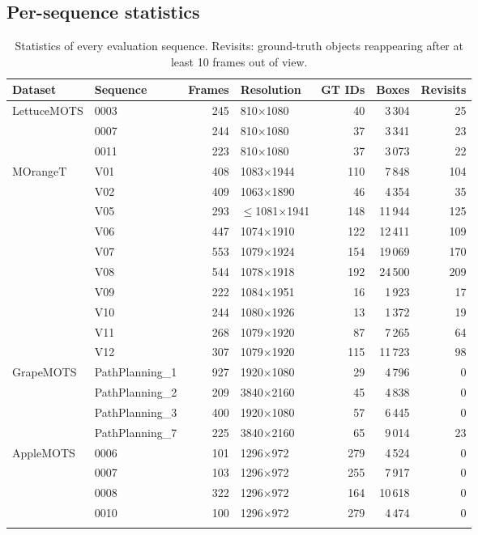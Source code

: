 \documentclass[pdflatex,sn-basic]{sn-jnl}%
\theoremstyle{thmstyleone}%
\begin{document}
\clearpage
\begin{appendices}

\section{Per-sequence statistics}\label{sec:app-seq}

\begin{table}[!h]
\caption{Statistics of every evaluation sequence. Revisits: ground-truth objects reappearing after at least 10 frames out of view.}\label{tab:seqstats}
\footnotesize
\begin{tabular*}{\textwidth}{@{\extracolsep\fill}llrlrrr@{}}
\toprule
Dataset & Sequence & Frames & Resolution & GT IDs & Boxes & Revisits \\
\midrule
\multirow{3}{*}{LettuceMOTS} & 0003 & 245 & 810$\times$1080 & 40 & 3\,304 & 25 \\
 & 0007 & 244 & 810$\times$1080 & 37 & 3\,341 & 23 \\
 & 0011 & 223 & 810$\times$1080 & 37 & 3\,073 & 22 \\
\midrule
\multirow{10}{*}{MOrangeT} & V01 & 408 & 1083$\times$1944 & 110 & 7\,848 & 104 \\
 & V02 & 409 & 1063$\times$1890 & 46 & 4\,354 & 35 \\
 & V05 & 293 & $\le$1081$\times$1941 & 148 & 11\,944 & 125 \\
 & V06 & 447 & 1074$\times$1910 & 122 & 12\,411 & 109 \\
 & V07 & 553 & 1079$\times$1924 & 154 & 19\,069 & 170 \\
 & V08 & 544 & 1078$\times$1918 & 192 & 24\,500 & 209 \\
 & V09 & 222 & 1084$\times$1951 & 16 & 1\,923 & 17 \\
 & V10 & 244 & 1080$\times$1926 & 13 & 1\,372 & 19 \\
 & V11 & 268 & 1079$\times$1920 & 87 & 7\,265 & 64 \\
 & V12 & 307 & 1079$\times$1920 & 115 & 11\,723 & 98 \\
\midrule
\multirow{4}{*}{GrapeMOTS} & PathPlanning\_1 & 927 & 1920$\times$1080 & 29 & 4\,796 & 0 \\
 & PathPlanning\_2 & 209 & 3840$\times$2160 & 45 & 4\,838 & 0 \\
 & PathPlanning\_3 & 400 & 1920$\times$1080 & 57 & 6\,445 & 0 \\
 & PathPlanning\_7 & 225 & 3840$\times$2160 & 65 & 9\,014 & 23 \\
\midrule
\multirow{4}{*}{AppleMOTS} & 0006 & 101 & 1296$\times$972 & 279 & 4\,524 & 0 \\
 & 0007 & 103 & 1296$\times$972 & 255 & 7\,917 & 0 \\
 & 0008 & 322 & 1296$\times$972 & 164 & 10\,618 & 0 \\
 & 0010 & 100 & 1296$\times$972 & 279 & 4\,474 & 0 \\
\botrule
\end{tabular*}
\end{table}


\end{appendices}
\end{document}
